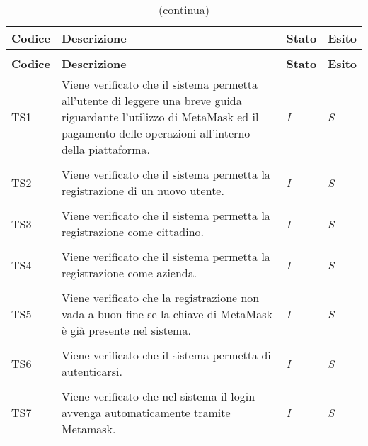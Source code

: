 	\begin{longtable}{ >{\centering}p{} >{}p{}
			>{\centering}p{} >{\centering}p{}}
			
		\caption{Riepilogo test di sistema}\\	
		\rowcolorhead
		\textbf{\color{white}Codice} 
		& \centering\textbf{\color{white}Descrizione} 
		& \centering\textbf{\color{white}Stato}
		& \centering\textbf{\color{white}Esito} 
		\tabularnewline %
		\endfirsthead	
		
		\rowcolor{white}\caption[]{(continua)}\\	
		\rowcolorhead
		\textbf{\color{white}Codice} 
		& \centering\textbf{\centering\color{white}Descrizione} 
		& \centering\textbf{\color{white}Stato}
		& \centering\textbf{\color{white}Esito} 
		\tabularnewline %
		\endhead	
		

		\hypertarget{TS1}{TS1} & Viene verificato che il sistema permetta all'utente 
		di leggere una breve guida riguardante l'utilizzo di MetaMask ed il pagamento 
		delle operazioni all'interno della piattaforma. & \textit{I} & \textit{S}\\ 

		\tabularnewline
		\hypertarget{TS2}{TS2} & Viene verificato che il sistema permetta la 
		registrazione di un nuovo utente. & \textit{I} & \textit{S}\\ 

		\tabularnewline
		\hypertarget{TS3}{TS3} & Viene verificato che il sistema permetta la 
		registrazione come cittadino. & \textit{I} & \textit{S}\\ 

		\tabularnewline
		\hypertarget{TS4}{TS4} & Viene verificato che il sistema permetta la 
		registrazione come azienda. & \textit{I} & \textit{S}\\ 

		\tabularnewline
		\hypertarget{TS5}{TS5} & Viene verificato che la registrazione non vada 
		a buon fine se la chiave di MetaMask è già presente nel sistema. & 
		\textit{I} & \textit{S}\\  

		\tabularnewline
		\hypertarget{TS6}{TS6} & Viene verificato che il sistema permetta di 
		autenticarsi. & \textit{I} & \textit{S}\\ 

		\tabularnewline
		\hypertarget{TS7}{TS7} & Viene verificato che nel sistema il login 
		avvenga automaticamente tramite Metamask. & \textit{I} & \textit{S}\\ 


\end{longtable}
